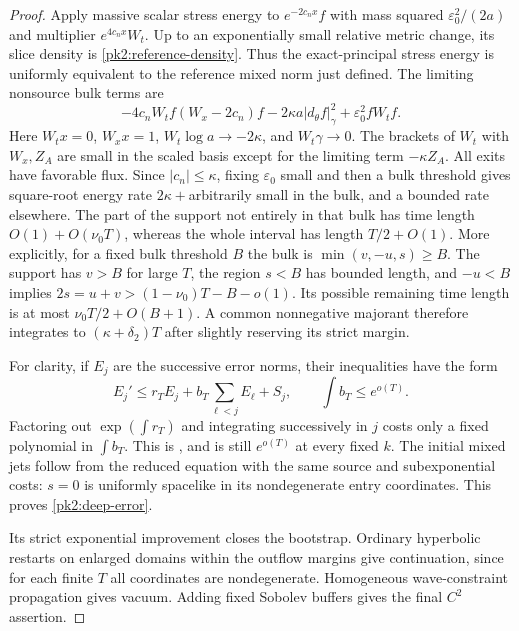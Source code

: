 \begin{proof}
Apply massive scalar stress energy to $e^{-2c_nx}f$ with mass squared
$\varepsilon_0^2/(2a)$ and multiplier $e^{4c_nx}W_t$. Up to an
exponentially small relative metric change, its slice density is
\eqref{pk2:reference-density}. Thus the exact-principal stress energy
is uniformly equivalent to the reference mixed norm just defined.
The limiting nonsource bulk terms are
\[
 -4c_nW_tf(W_x-2c_n)f
       -2\kappa a|d_\theta f|_\gamma^2
       +\varepsilon_0^2fW_tf.
\]
Here $W_tx=0$, $W_xx=1$, $W_t\log a\to-2\kappa$, and
$W_t\gamma\to0$. The brackets of $W_t$ with $W_x,Z_A$ are small
in the scaled basis except for the limiting term $-\kappa Z_A$.
All exits have favorable flux. Since $|c_n|\le\kappa$, fixing
$\varepsilon_0$ small and then a bulk threshold gives square-root
energy rate $2\kappa+$arbitrarily small in the bulk, and a bounded
rate elsewhere. The part of the support not entirely in that bulk
has time length $O(1)+O(\nu_0T)$, whereas the whole interval has
length $T/2+O(1)$. More explicitly, for a fixed bulk threshold $B$
the bulk is $\min(v,-u,s)\ge B$. The support has $v>B$ for large
$T$, the region $s<B$ has bounded length, and $-u<B$ implies
$2s=u+v>(1-\nu_0)T-B-o(1)$. Its possible remaining time length
is at most $\nu_0T/2+O(B+1)$.
A common nonnegative majorant therefore integrates
to $(\kappa+\delta_2)T$ after slightly reserving its strict margin.

For clarity, if $E_j$ are the successive error norms, their
inequalities have the form
\[
 E_j'\le r_TE_j+b_T\sum_{\ell<j}E_\ell+S_j,
 \qquad \int b_T\le e^{o(T)}.
\]
Factoring out $\exp(\int r_T)$ and integrating successively in $j$
costs only a fixed polynomial in $\int b_T$. This is
, and is still $e^{o(T)}$ at every
fixed $k$. The initial mixed jets follow from the reduced equation
with the same source and subexponential costs: $s=0$ is uniformly
spacelike in its nondegenerate entry coordinates. This proves
\eqref{pk2:deep-error}.

Its strict exponential improvement closes the bootstrap. Ordinary
hyperbolic restarts on enlarged domains within the outflow margins
give continuation, since for each finite $T$ all coordinates are
nondegenerate. Homogeneous wave-constraint propagation gives vacuum.
Adding fixed Sobolev buffers gives the final $C^2$ assertion.
\end{proof}

